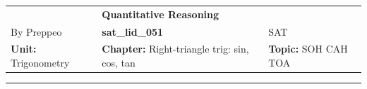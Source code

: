 \documentclass[11pt,paper=a4,answers]{exam}
\begin{document}
\begin{center}
    \centering
    \renewcommand{\arraystretch}{1.5}
    \begin{tabularx}{\textwidth}{YYY}
    & \normalsize\bf{{\Large{{Quantitative Reasoning}}}} & \\
    By Preppeo & \normalsize\bf{{sat\_lid\_051}} & SAT\\
    \normalsize{{\textbf{{Unit:}} Trigonometry}} & \normalsize{{\textbf{{Chapter:}} Right-triangle trig: sin, cos, tan}} & \normalsize{{\textbf{{Topic:}} SOH CAH TOA}} \\
    \end{tabularx}
\end{center}
\par\noindent\rule{\textwidth}{1pt}
\end{document}
